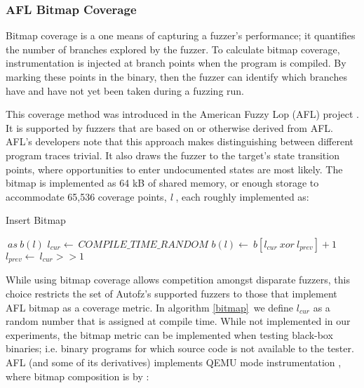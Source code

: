 \subsubsection{AFL Bitmap Coverage}
Bitmap coverage is a one means of capturing a fuzzer's performance; it quantifies the number of
 branches explored by the fuzzer. To calculate bitmap coverage, instrumentation is injected at branch 
 points when the program is compiled. By marking these points in the binary, then the fuzzer can 
 identify which branches have and have not yet been taken during a fuzzing run. 
 \cite{noauthor_afldocstechnical_detailstxt_nodate}

 This coverage method was introduced in the American Fuzzy Lop (AFL) project \cite{noauthor_afldocstechnical_detailstxt_nodate}. 
 It is supported by fuzzers that are based on or otherwise derived from AFL.  AFL's developers 
 note that this approach makes distinguishing between different program traces trivial. It also draws 
 the fuzzer to the target's state transition points, where opportunities to enter undocumented states 
 are most likely. The bitmap is implemented as 64 kB of shared memory, or enough storage to 
 accommodate 65,536 coverage points, \emph{l} \cite{yun_qsym_2018}, each roughly implemented as:

 \begin{algorithm}
    \caption {Insert Bitmap}\label{bitmap}
    \begin{algorithmic}[1]
        $\ as\ b(l)$
            \State $l_{cur} \gets\ COMPILE\_TIME\_RANDOM$
            \State $b(l) \gets\ b[l_{cur}\  xor\  l_{prev}] + 1$
            \State $l_{prev} \gets\ l_{cur} >> 1$
        \EndProcedure
    \end{algorithmic}
\end{algorithm}
 
While using bitmap coverage allows competition amongst disparate fuzzers, this choice restricts the 
set of Autofz's supported fuzzers to those that implement AFL bitmap as a coverage metric. In algorithm 
\ref{bitmap}\, we define \emph{$l_{cur}$} as a random number that is assigned at compile time. While 
not implemented in our experiments, the bitmap metric can be implemented when testing black-box binaries; 
i.e. binary programs for which source code is not available to the tester. AFL (and some of its derivatives)
implements QEMU mode instrumentation \cite{noauthor_aflqemu_mode_nodate}, where bitmap composition is 
by \cite{noauthor_afldocstechnical_detailstxt_nodate}:

